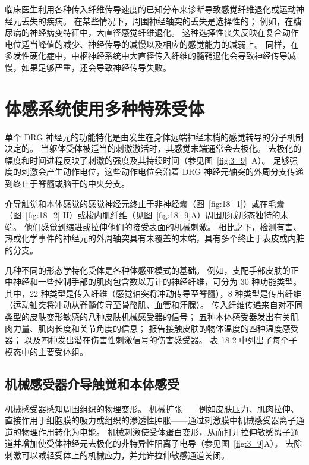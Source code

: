 临床医生利用各种传入纤维传导速度的已知分布来诊断导致感觉纤维退化或运动神经元丢失的疾病。
在某些情况下，周围神经轴突的丢失是选择性的；
例如，在糖尿病的神经病变特征中，大直径感觉纤维退化。
这种选择性丧失反映在复合动作电位适当峰值的减少、神经传导的减慢以及相应的感觉能力的减弱上。
同样，在多发性硬化症中，中枢神经系统中大直径传入纤维的髓鞘退化会导致神经传导减慢，如果足够严重，还会导致神经传导失败。



\section{体感系统使用多种特殊受体}

单个 DRG 神经元的功能特化是由发生在身体远端神经末梢的感觉转导的分子机制决定的。
当躯体受体被适当的刺激激活时，其感觉末端通常会去极化。
去极化的幅度和时间进程反映了刺激的强度及其持续时间（参见图~\ref{fig:3_9}~A）。 
足够强度的刺激会产生动作电位，这些动作电位会沿着 DRG 神经元轴突的外周分支传递到终止于脊髓或脑干的中央分支。


介导触觉和本体感觉的感觉神经元终止于非神经囊（图~\ref{fig:18_1}）或在毛囊（图~\ref{fig:18_2} H）或梭内肌纤维（见图~\ref{fig:18_9}A）周围形成形态独特的末端。
他们感觉到缩进或拉伸他们的接受表面的机械刺激。
相比之下，检测有害、热或化学事件的神经元的外周轴突具有未覆盖的末端，具有多个终止于表皮或内脏的分支。


几种不同的形态学特化受体是各种体感亚模式的基础。
例如，支配手部皮肤的正中神经和一些控制手部的肌肉包含数以万计的神经纤维，可分为 30 种功能类型。
其中，22 种类型是传入纤维（感觉轴突将冲动传导至脊髓），8 种类型是传出纤维（运动轴突将冲动从脊髓传导至骨骼肌、血管和汗腺）。
传入纤维传递来自对不同类型的皮肤变形敏感的八种皮肤机械感受器的信号；
五种本体感受器发出有关肌肉力量、肌肉长度和关节角度的信息；
报告接触皮肤的物体温度的四种温度感受器；
以及四种发出潜在伤害性刺激信号的伤害感受器。
表 18-2 中列出了每个子模态中的主要受体组。



\subsection{机械感受器介导触觉和本体感受}

机械感受器感知周围组织的物理变形。
机械扩张——例如皮肤压力、肌肉拉伸、直接作用于细胞膜的吸力或组织的渗透性肿胀——通过刺激膜中机械感受器离子通道的物理作用转化为电能。
机械刺激使受体蛋白变形，从而打开拉伸敏感离子通道并增加使受体神经元去极化的非特异性阳离子电导（参见图~\ref{fig:3_9}A）。
去除刺激可以减轻受体上的机械应力，并允许拉伸敏感通道关闭。


